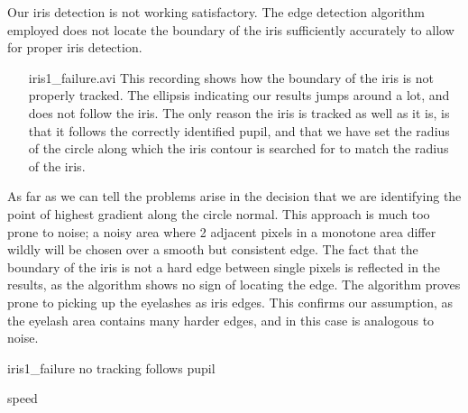 Our iris detection is not working satisfactory. The edge detection algorithm employed does not locate the boundary of the iris sufficiently accurately to allow for proper iris detection.
\begin{itemize}
	\item[iris1\_failure.avi] This recording shows how the boundary of the iris is not properly tracked. The ellipsis indicating our results jumps around a lot, and does not follow the iris. The only reason the iris is tracked as well as it is, is that it follows the correctly identified pupil, and that we have set the radius of the circle along which the iris contour is searched for to match the radius of the iris.
\end{itemize}
As far as we can tell the problems arise in the decision that we are identifying the point of highest gradient along the circle normal. This approach is much too prone to noise; a noisy area where 2 adjacent pixels in a monotone area differ wildly will be chosen over a smooth but consistent edge. The fact that the boundary of the iris is not a hard edge between single pixels is reflected in the results, as the algorithm shows no sign of locating the edge. The algorithm proves prone to picking up the eyelashes as iris edges. This confirms our assumption, as the eyelash area contains many harder edges, and in this case is analogous to noise.


iris1\_failure
no tracking
follows pupil

speed